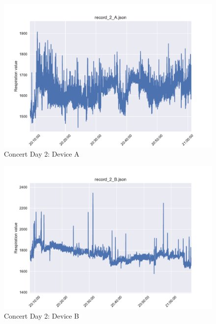 \begin{figure}
    \centering
    \includegraphics[scale=0.6]{images/record_2_a.pdf}
    \caption{Concert Day 2: Device A}
    \label{fig:concert_day2_a}
\end{figure}

\begin{figure}
    \centering
    \includegraphics[scale=0.6]{images/record_2_b.pdf}
    \caption{Concert Day 2: Device B}
    \label{fig:concert_day2_b}
\end{figure}

